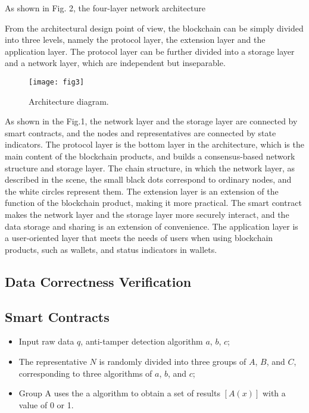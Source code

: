 \documentclass{ieeeaccess}
\begin{document}
As shown in Fig. 2, the four-layer network architecture 

From the architectural design point of view, the blockchain can be simply divided into three levels, namely the protocol layer, the extension layer and the application layer. The protocol layer can be further divided into a storage layer and a network layer, which are independent but inseparable.
\begin{figure}[htbp]
\begin{center}
\texttt{[image: fig3]}
\caption{Architecture diagram.}
\label{f}
\end{center}
\end{figure}

As shown in the Fig.1, the network layer and the storage layer are connected by smart contracts, and the nodes and representatives are connected by state indicators. The protocol layer is the bottom layer in the architecture, which is the main content of the blockchain products, and builds a consensus-based network structure and storage layer. The chain structure, in which the network layer, as described in the scene, the small black dots correspond to ordinary nodes, and the white circles represent them. The extension layer is an extension of the function of the blockchain product, making it more practical. The smart contract makes the network layer and the storage layer more securely interact, and the data storage and sharing is an extension of convenience. The application layer is a user-oriented layer that meets the needs of users when using blockchain products, such as wallets, and status indicators in wallets.

\subsection{Data Correctness Verification}

\subsection{Smart Contracts}

\begin{itemize}
\item Input raw data $q$, anti-tamper detection algorithm $a$, $b$, $c$;
\item The representative $N$ is randomly divided into three groups of $A$, $B$, and $C$, corresponding to three algorithms of $a$, $b$, and $c$;
\item Group A uses the a algorithm to obtain a set of results $[A(x)]$ with a value of 0 or 1.
\end{itemize}
\end{document}
